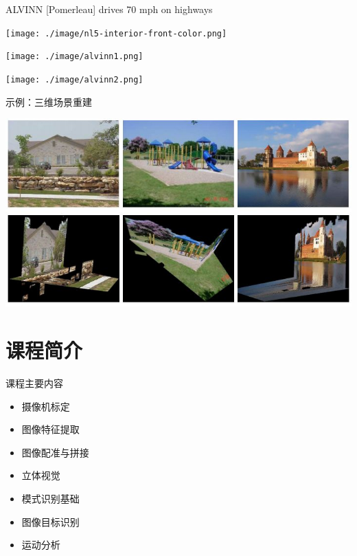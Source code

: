 \documentclass[presentation]{beamer}
\begin{document}
\begin{frame}[label={sec:orgc463a14}]{ALVINN [Pomerleau] drives 70 mph on highways}
\begin{center}
\texttt{[image: ./image/nl5-interior-front-color.png]}
\end{center}
\begin{center}
\texttt{[image: ./image/alvinn1.png]}
\end{center}
\begin{center}
\texttt{[image: ./image/alvinn2.png]}
\end{center}
\end{frame}


\begin{frame}[label={sec:org83fefa4}]{示例：三维场景重建}
\begin{center}
\includegraphics[width=.9\linewidth]{./image/scene.jpg}
\end{center}
\end{frame}




\section{课程简介}
\label{sec:org3024e2d}

\begin{frame}[label={sec:org42799cb}]{课程主要内容}
\begin{itemize}
\item 摄像机标定
\item 图像特征提取
\item 图像配准与拼接
\item 立体视觉
\item 模式识别基础
\item 图像目标识别
\item 运动分析
\end{itemize}
\end{frame}
\end{document}
